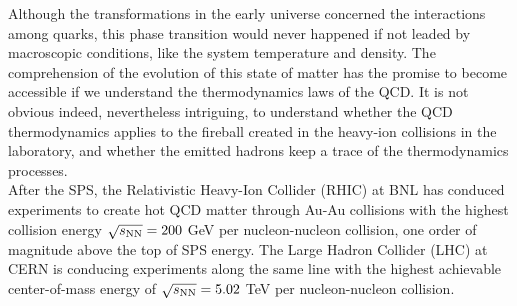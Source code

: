 Although the transformations in the early universe concerned the interactions among quarks,
this phase transition would never happened if not leaded by macroscopic
conditions, like the system temperature and density. The comprehension 
of the evolution of this state of matter 
has the promise to become accessible if we understand the thermodynamics 
laws of the QCD. It is not obvious indeed, nevertheless intriguing, 
to understand whether the QCD thermodynamics applies to the fireball 
created in the heavy-ion collisions in the laboratory, and whether the 
emitted hadrons keep a trace of the thermodynamics processes. \\

After the SPS, the Relativistic Heavy-Ion Collider (RHIC) at BNL 
has conduced experiments to create hot QCD matter through Au-Au 
collisions with the highest collision energy $\sqrt{s_{\rm NN}} = 200$ GeV per nucleon-nucleon
collision, one order of magnitude above the top of SPS energy. 
The Large Hadron Collider (LHC) at CERN is conducing experiments 
along the same line with the highest achievable center-of-mass 
energy of $\sqrt{s_{\rm NN}} = 5.02$ TeV per nucleon-nucleon collision.

